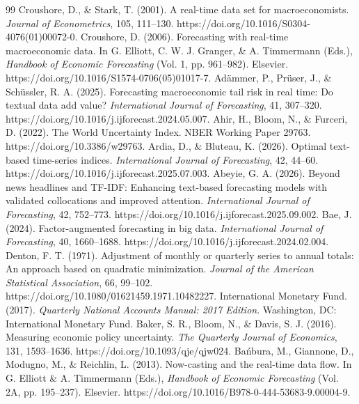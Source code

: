 \documentclass[preprint,12pt,authoryear]{elsarticle}
\begin{document}
\clearpage
\begin{thebibliography}{99}
 Croushore, D., \& Stark, T. (2001). A real-time data set for macroeconomists. \emph{Journal of Econometrics}, 105, 111--130. https://doi.org/10.1016/S0304-4076(01)00072-0.
 Croushore, D. (2006). Forecasting with real-time macroeconomic data. In G. Elliott, C. W. J. Granger, \& A. Timmermann (Eds.), \emph{Handbook of Economic Forecasting} (Vol. 1, pp. 961--982). Elsevier. https://doi.org/10.1016/S1574-0706(05)01017-7.
 Ad{\"a}mmer, P., Pr{\"u}ser, J., \& Sch{\"u}ssler, R. A. (2025). Forecasting macroeconomic tail risk in real time: Do textual data add value? \emph{International Journal of Forecasting}, 41, 307--320. https://doi.org/10.1016/j.ijforecast.2024.05.007.
 Ahir, H., Bloom, N., \& Furceri, D. (2022). The World Uncertainty Index. NBER Working Paper 29763. https://doi.org/10.3386/w29763.
 Ardia, D., \& Bluteau, K. (2026). Optimal text-based time-series indices. \emph{International Journal of Forecasting}, 42, 44--60. https://doi.org/10.1016/j.ijforecast.2025.07.003.
 Abeyie, G. A. (2026). Beyond news headlines and TF-IDF: Enhancing text-based forecasting models with validated collocations and improved attention. \emph{International Journal of Forecasting}, 42, 752--773. https://doi.org/10.1016/j.ijforecast.2025.09.002.
 Bae, J. (2024). Factor-augmented forecasting in big data. \emph{International Journal of Forecasting}, 40, 1660--1688. https://doi.org/10.1016/j.ijforecast.2024.02.004.
 Denton, F. T. (1971). Adjustment of monthly or quarterly series to annual totals: An approach based on quadratic minimization. \emph{Journal of the American Statistical Association}, 66, 99--102. https://doi.org/10.1080/01621459.1971.10482227.
 International Monetary Fund. (2017). \emph{Quarterly National Accounts Manual: 2017 Edition}. Washington, DC: International Monetary Fund.
 Baker, S. R., Bloom, N., \& Davis, S. J. (2016). Measuring economic policy uncertainty. \emph{The Quarterly Journal of Economics}, 131, 1593--1636. https://doi.org/10.1093/qje/qjw024.
 Ba{\'n}bura, M., Giannone, D., Modugno, M., \& Reichlin, L. (2013). Now-casting and the real-time data flow. In G. Elliott \& A. Timmermann (Eds.), \emph{Handbook of Economic Forecasting} (Vol. 2A, pp. 195--237). Elsevier. https://doi.org/10.1016/B978-0-444-53683-9.00004-9.

\end{thebibliography}
\end{document}
